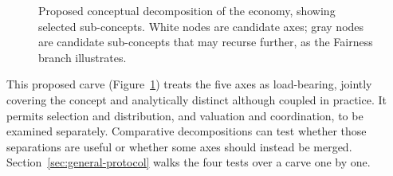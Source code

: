 \documentclass[11pt]{article}
\begin{document}
\begin{figure}[H]
\centering
{}
\caption{Proposed conceptual decomposition of the economy, showing selected sub-concepts. White nodes are candidate axes; gray nodes are candidate sub-concepts that may recurse further, as the Fairness branch illustrates.}
\label{fig:economy-tree}
\end{figure}

This proposed carve (Figure~\ref{fig:economy-tree}) treats the five axes as load-bearing, jointly covering the concept and analytically distinct although coupled in practice. It permits selection and distribution, and valuation and coordination, to be examined separately. Comparative decompositions can test whether those separations are useful or whether some axes should instead be merged. Section~\ref{sec:general-protocol} walks the four tests over a carve one by one.
\end{document}
